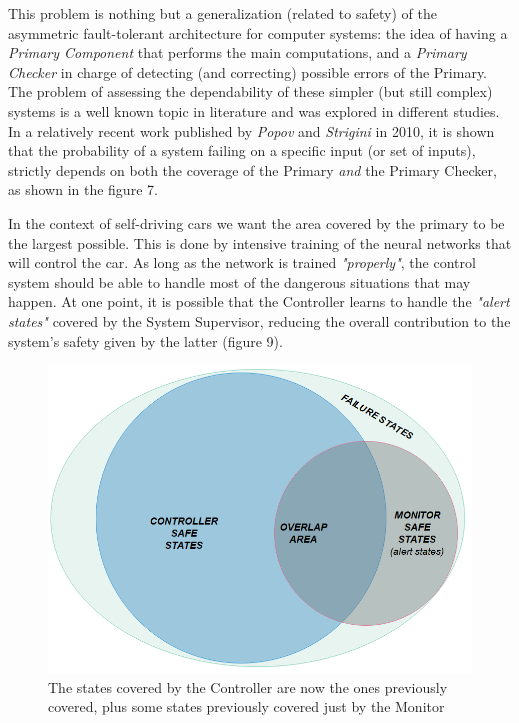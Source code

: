 This problem is nothing but a generalization (related to safety) of the asymmetric fault-tolerant architecture for computer systems: the idea of having a \textsl{Primary Component} that performs the main computations, and a \textsl{Primary Checker} in charge of detecting (and correcting) possible errors of the Primary.\newline
The problem of assessing the dependability of these simpler (but still complex) systems is a well known topic in literature and was explored in different studies. In a relatively recent work published by \textsl{Popov} and \textsl{Strigini} in 2010, it is shown that the probability of a system failing on a specific input (or set of inputs), strictly depends on both the coverage of the Primary \textsl{and} the Primary Checker, as shown in the figure 7.\cite{striginiPopov}

In the context of self-driving cars we want the area covered by the primary to be the largest possible. This is done by intensive training of the neural networks that will control the car. As long as the network is trained \textsl{"properly"}, the control system should be able to handle most of the dangerous situations that may happen. At one point, it is possible that the Controller learns to handle the \textsl{"alert states"} covered by the System Supervisor, reducing the overall contribution to the system's safety given by the latter (figure 9).\vspace{0.5cm}

\begin{figure}[h!]
	\includegraphics[width=\textwidth]{img/area-growth-good.png}
	\caption{The states covered by the Controller are now the ones previously covered, plus some states previously covered just by the Monitor}
\end{figure}

